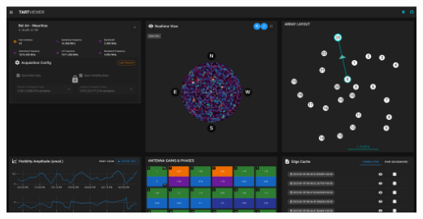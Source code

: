 \documentclass[ignorenonframetext]{beamer}
\begin{document}
\begin{frame}
 \includegraphics[width=\linewidth]{fig/browser_view.png}
\end{frame}

%
%
%
%

% 
% 
% 
\end{document}
